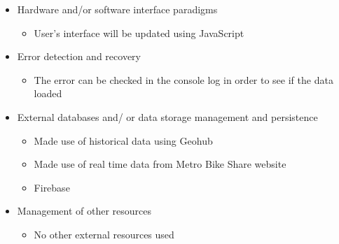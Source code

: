 \documentclass[a4paper,12pt]{article}
\begin{document}
\begin{itemize}
  \item Hardware and/or software interface paradigms
    \begin{itemize}
    \item User’s interface will be updated using JavaScript
  \end{itemize}
\end{itemize}
\begin{itemize}
  \item Error detection and recovery
    \begin{itemize}
    \item The error can be checked in the console log in order to see if the data loaded
  \end{itemize}
\end{itemize}
\begin{itemize}
  \item External databases and/ or data storage management and persistence
    \begin{itemize}
    \item Made use of historical data using Geohub
    \item Made use of real time data from Metro Bike Share website
    \item Firebase
  \end{itemize}
\end{itemize}
\begin{itemize}
  \item Management of other resources
    \begin{itemize}
    \item No other external resources used
  \end{itemize}
\end{itemize}
\end{document}
